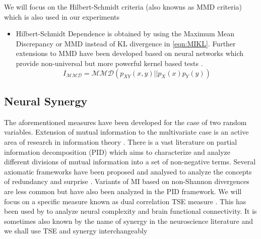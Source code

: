 \documentclass[letterpaper]{article} %
\begin{document}
We will focus on the Hilbert-Schmidt criteria (also knowns as MMD criteria) which is also used in our experiments
\begin{itemize}
    
    \item
    Hilbert-Schmidt Dependence \citep{gretton2005measuring} is obtained by using the Maximum Mean Discrepancy or MMD \citep{gretton2012mmd} instead of KL divergence in \eqref{eqn:MIKL}. Further extensions to MMD have been developed based on neural networks which provide non-universal but more powerful kernel based tests \citep{liu2020learning}. 
    $$I_{\mathcal{MMD}} = \mathcal{MMD}\left(p_{X Y}(x, y) || p_{X}(x) p_{Y}(y)\right)$$
    
\end{itemize}


\subsection{Neural Synergy}
The aforementioned measures have been developed for the case of two random variables. Extension of mutual information to the multivariate case is an active area of research in information theory \cite{griffith2014quantifying, ince2017measuring}. 
There is a vast literature on partial information decomposition (PID) \cite{williams2010nonnegative} which aims to characterize and analyze different divisions of mutual information into a set of non-negative terms. Several axiomatic frameworks have been proposed and analysed  to analyze the concepts of redundancy \citet{williams2010nonnegative, kolchinsky2019novel} and surprise \cite{ince2017measuring}. Variants of MI based on non-Shannon divergences \cite{james2017multivariate,gacs1973common} are less common but have also been analyzed in the PID framework. We will focus on a specific measure known as dual correlation TSE measure \cite{tononi1994measure}. This has been used by \citet{rosas2019quantifying,barrett2011practical} to analyze neural complexity and brain functional connectivity. It is sometimes also known by the name of synergy in the neuroscience literature \citep{mediano2019measuring} and we shall use TSE and synergy interchangeably



\end{document}
